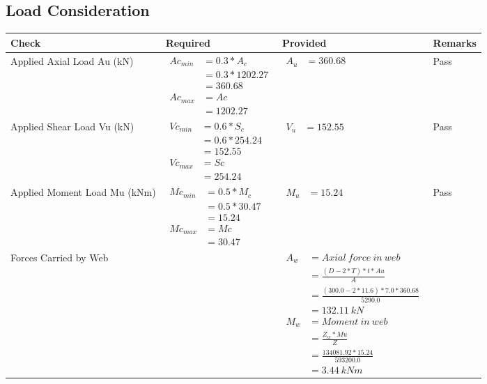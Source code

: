 \documentclass{article}%
\begin{document}
\subsection{Load Consideration}%
\label{subsec:LoadConsideration}%
\renewcommand{\arraystretch}{1.2}%
\begin{longtable}{|p{4cm}|p{3.5cm}|p{6.5cm}|p{1.5cm}|}%
\hline%
\rowcolor{OsdagGreen}%
Check&Required&Provided&Remarks\\%
\hline%
\endhead%
\hline%
Applied Axial Load Au (kN)&$\begin{aligned} Ac_{min} &= 0.3 * A_c\\ &= 0.3 *1202.27\\ &=360.68\\ Ac_{max} &= Ac \\ &=1202.27\end{aligned}$&$\begin{aligned} A_u &=360.68\end{aligned}$&Pass\\%
\hline%
Applied Shear Load Vu (kN)&$\begin{aligned} Vc_{min} &= 0.6 * S_c\\ &= 0.6 *254.24\\ &=152.55\\ Vc_{max} &= Sc \\ &=254.24\end{aligned}$&$\begin{aligned} V_u &=152.55\end{aligned}$&Pass\\%
\hline%
Applied Moment Load Mu (kNm)&$\begin{aligned} Mc_{min} &= 0.5 * M_c\\ &= 0.5 *30.47\\ &=15.24\\  Mc_{max} &= Mc \\ &=30.47\end{aligned}$&$\begin{aligned} M_u &=15.24\end{aligned}$&Pass\\%
\hline%
Forces Carried by Web&&$\begin{aligned}A_w &= Axial~ force~ in~ web  \\   &= \frac{(D- 2*T)*t* Au }{A} \\ &= \frac{(300.0- 2*11.6)*7.0*360.68 }{5290.0} \\ &=132.11~ kN\\ M_w &= Moment ~in ~web  \\  &= \frac{Z_w * Mu}{Z} \\ &= \frac{134081.92 * 15.24}{593200.0} \\ &=3.44~{kNm}\end{aligned}$&\\%

\end{longtable}
\end{document}
